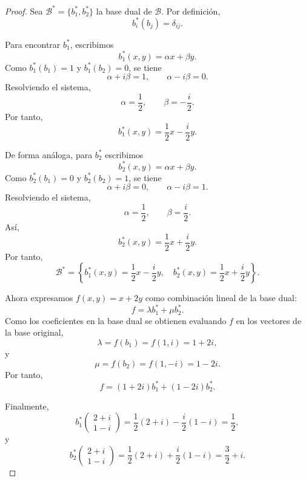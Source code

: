 \documentclass[a4,10pt]{aleph-notas}
\begin{document}
\begin{proof}
Sea $\mathcal{B}^*=\{b_1^*,b_2^*\}$ la base dual de $\mathcal{B}$. Por definición,
\[
    b_i^*(b_j)=\delta_{ij}.
\]

Para encontrar $b_1^*$, escribimos
\[
    b_1^*(x,y)=\alpha x+\beta y.
\]
Como $b_1^*(b_1)=1$ y $b_1^*(b_2)=0$, se tiene
\[
    \alpha+i\beta=1,
    \qquad
    \alpha-i\beta=0.
\]
Resolviendo el sistema,
\[
    \alpha=\frac{1}{2},
    \qquad
    \beta=-\frac{i}{2}.
\]
Por tanto,
\[
    b_1^*(x,y)=\frac{1}{2}x-\frac{i}{2}y.
\]

De forma análoga, para $b_2^*$ escribimos
\[
    b_2^*(x,y)=\alpha x+\beta y.
\]
Como $b_2^*(b_1)=0$ y $b_2^*(b_2)=1$, se tiene
\[
    \alpha+i\beta=0,
    \qquad
    \alpha-i\beta=1.
\]
Resolviendo el sistema,
\[
    \alpha=\frac{1}{2},
    \qquad
    \beta=\frac{i}{2}.
\]
Así,
\[
    b_2^*(x,y)=\frac{1}{2}x+\frac{i}{2}y.
\]
Por tanto,
\[
    \mathcal{B}^*
    =
    \left\{
        b_1^*(x,y)=\frac{1}{2}x-\frac{i}{2}y,
        \quad
        b_2^*(x,y)=\frac{1}{2}x+\frac{i}{2}y
    \right\}.
\]

Ahora expresamos $f(x,y)=x+2y$ como combinación lineal de la base dual:
\[
    f=\lambda b_1^*+\mu b_2^*.
\]
Como los coeficientes en la base dual se obtienen evaluando $f$ en los vectores de la base original,
\[
    \lambda=f(b_1)=f(1,i)=1+2i,
\]
y
\[
    \mu=f(b_2)=f(1,-i)=1-2i.
\]
Por tanto,
\[
    f=(1+2i)b_1^*+(1-2i)b_2^*.
\]

Finalmente,
\[
    b_1^*\begin{pmatrix}2+i\\ 1-i\end{pmatrix}
    =
    \frac{1}{2}(2+i)-\frac{i}{2}(1-i)
    =
    \frac{1}{2},
\]
y
\[
    b_2^*\begin{pmatrix}2+i\\ 1-i\end{pmatrix}
    =
    \frac{1}{2}(2+i)+\frac{i}{2}(1-i)
    =
    \frac{3}{2}+i.
\]
\end{proof}
\end{document}
